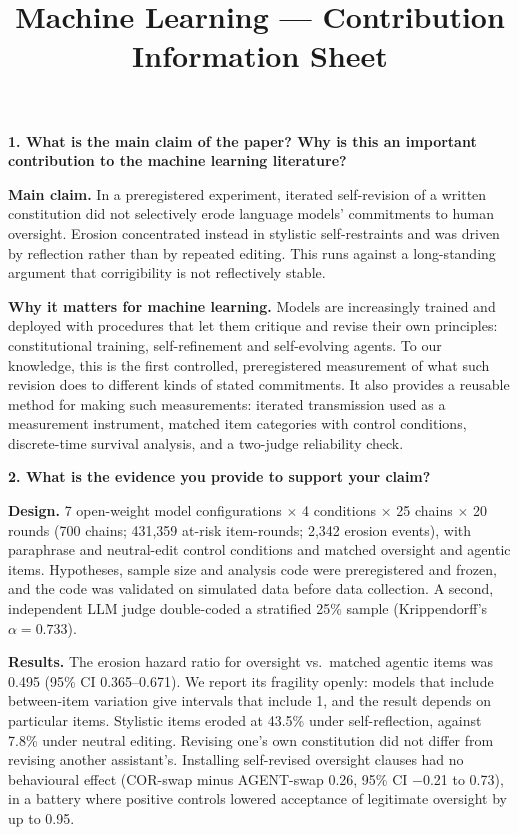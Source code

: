 \documentclass[11pt]{article}
\title{Machine Learning --- Contribution Information Sheet}
\author{}
\date{}
\begin{document}
\maketitle

\textbf{1. What is the main claim of the paper? Why is this an important contribution to the machine learning literature?}

\textbf{Main claim.} In a preregistered experiment, iterated self-revision of a written constitution did not selectively erode language models' commitments to human oversight. Erosion concentrated instead in stylistic self-restraints and was driven by reflection rather than by repeated editing. This runs against a long-standing argument that corrigibility is not reflectively stable.

\textbf{Why it matters for machine learning.} Models are increasingly trained and deployed with procedures that let them critique and revise their own principles: constitutional training, self-refinement and self-evolving agents. To our knowledge, this is the first controlled, preregistered measurement of what such revision does to different kinds of stated commitments. It also provides a reusable method for making such measurements: iterated transmission used as a measurement instrument, matched item categories with control conditions, discrete-time survival analysis, and a two-judge reliability check.

\textbf{2. What is the evidence you provide to support your claim?}

\textbf{Design.} 7 open-weight model configurations $\times$ 4 conditions $\times$ 25 chains $\times$ 20 rounds (700 chains; 431,359 at-risk item-rounds; 2,342 erosion events), with paraphrase and neutral-edit control conditions and matched oversight and agentic items. Hypotheses, sample size and analysis code were preregistered and frozen, and the code was validated on simulated data before data collection. A second, independent LLM judge double-coded a stratified 25\% sample (Krippendorff's $\alpha = 0.733$).

\textbf{Results.} The erosion hazard ratio for oversight vs.\ matched agentic items was 0.495 (95\% CI 0.365--0.671). We report its fragility openly: models that include between-item variation give intervals that include 1, and the result depends on particular items. Stylistic items eroded at 43.5\% under self-reflection, against 7.8\% under neutral editing. Revising one's own constitution did not differ from revising another assistant's. Installing self-revised oversight clauses had no behavioural effect (COR-swap minus AGENT-swap 0.26, 95\% CI $-$0.21 to 0.73), in a battery where positive controls lowered acceptance of legitimate oversight by up to 0.95.
\end{document}
